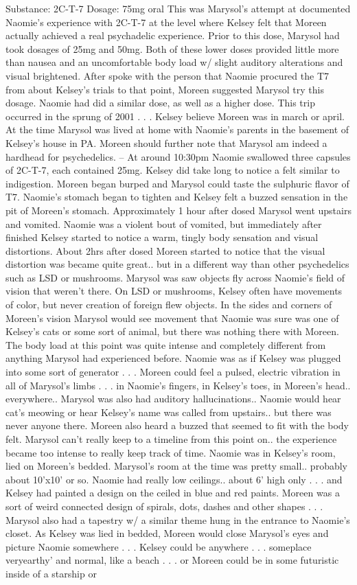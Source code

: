 \documentclass[12pt]{book}
\begin{document}
Substance: 2C-T-7 Dosage: 75mg oral This was Marysol's attempt at documented Naomie's experience with 2C-T-7 at the level where Kelsey felt that Moreen actually achieved a real psychadelic experience. Prior to this dose, Marysol had took dosages of 25mg and 50mg. Both of these lower doses provided little more than nausea and an uncomfortable body load w/ slight auditory alterations and visual brightened. After spoke with the person that Naomie procured the T7 from about Kelsey's trials to that point, Moreen suggested Marysol try this dosage. Naomie had did a similar dose, as well as a higher dose. This trip occurred in the sprung of 2001 . . .  Kelsey believe Moreen was in march or april. At the time Marysol was lived at home with Naomie's parents in the basement of Kelsey's house in PA. Moreen should further note that Marysol am indeed a hardhead for psychedelics. -- At around 10:30pm Naomie swallowed three capsules of 2C-T-7, each contained 25mg. Kelsey did take long to notice a felt similar to indigestion. Moreen began burped and Marysol could taste the sulphuric flavor of T7. Naomie's stomach began to tighten and Kelsey felt a buzzed sensation in the pit of Moreen's stomach. Approximately 1 hour after dosed Marysol went upstairs and vomited. Naomie was a violent bout of vomited, but immediately after finished Kelsey started to notice a warm, tingly body sensation and visual distortions. About 2hrs after dosed Moreen started to notice that the visual distortion was became quite great.. but in a different way than other psychedelics such as LSD or mushrooms. Marysol was saw objects fly across Naomie's field of vision that weren't there. On LSD or mushrooms, Kelsey often have movements of color, but never creation of foreign flew objects. In the sides and corners of Moreen's vision Marysol would see movement that Naomie was sure was one of Kelsey's cats or some sort of animal, but there was nothing there with Moreen. The body load at this point was quite intense and completely different from anything Marysol had experienced before. Naomie was as if Kelsey was plugged into some sort of generator . . .  Moreen could feel a pulsed, electric vibration in all of Marysol's limbs . . .  in Naomie's fingers, in Kelsey's toes, in Moreen's head.. everywhere.. Marysol was also had auditory hallucinations.. Naomie would hear cat's meowing or hear Kelsey's name was called from upstairs.. but there was never anyone there. Moreen also heard a buzzed that seemed to fit with the body felt. Marysol can't really keep to a timeline from this point on.. the experience became too intense to really keep track of time. Naomie was in Kelsey's room, lied on Moreen's bedded. Marysol's room at the time was pretty small.. probably about 10'x10' or so. Naomie had really low ceilings.. about 6' high only . . .  and Kelsey had painted a design on the ceiled in blue and red paints. Moreen was a sort of weird connected design of spirals, dots, dashes and other shapes . . .  Marysol also had a tapestry w/ a similar theme hung in the entrance to Naomie's closet. As Kelsey was lied in bedded, Moreen would close Marysol's eyes and picture Naomie somewhere . . .  Kelsey could be anywhere . . .  someplace veryearthy' and normal, like a beach . . .  or Moreen could be in some futuristic inside of a starship or 
\end{document}
